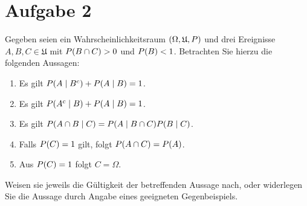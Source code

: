 \documentclass{exercise}
\begin{document}
    \section*{Aufgabe 2}

    \begin{problem}
        Gegeben seien ein Wahrscheinlichkeitsraum \(\parentheses*{\Omega, \mathfrak{U}, P}\) und drei Ereignisse \(A, B, C \in \mathfrak{U}\) mit \(P\parentheses*{B \cap C} > 0\) und \(P\parentheses*{B} < 1\).
        Betrachten Sie hierzu die folgenden Aussagen:
        \begin{enumerate}
            \item Es gilt \(P\parentheses*{A \mid B^c} + P\parentheses*{A \mid B} = 1\).
            \item Es gilt \(P\parentheses*{A^c \mid B} + P\parentheses*{A \mid B} = 1\).
            \item Es gilt \(P\parentheses*{A \cap B \mid C} = P\parentheses*{A \mid B \cap C}P\parentheses*{B \mid C}\).
            \item Falls \(P\parentheses*{C} = 1\) gilt, folgt \(P\parentheses*{A \cap C} = P\parentheses*{A}\).
            \item Aus \(P\parentheses*{C} = 1\) folgt \(C = \Omega\).
        \end{enumerate}
        Weisen sie jeweils die Gültigkeit der betreffenden Aussage nach, oder widerlegen Sie die Aussage durch Angabe eines geeigneten Gegenbeispiels.
    \end{problem}
\end{document}
